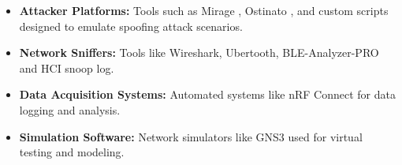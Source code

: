 \vspace{-4pt}

\begin{itemize}[leftmargin=0.1cm]
    \setlength{\itemsep}{-0.1cm}
    \item \textbf{Attacker Platforms:} Tools such as Mirage \cite{sun2020towards}, Ostinato \cite{khamaiseh2019detecting}, and custom scripts designed to emulate spoofing attack scenarios.
    \item \textbf{Network Sniffers:} Tools like Wireshark, Ubertooth, BLE-Analyzer-PRO and HCI snoop log.
    \item \textbf{Data Acquisition Systems:} Automated systems like nRF Connect for data logging and analysis.
    \item \textbf{Simulation Software:} Network simulators like GNS3 \cite{neumann2015book} used for virtual testing and modeling.
\end{itemize}




\newpage
